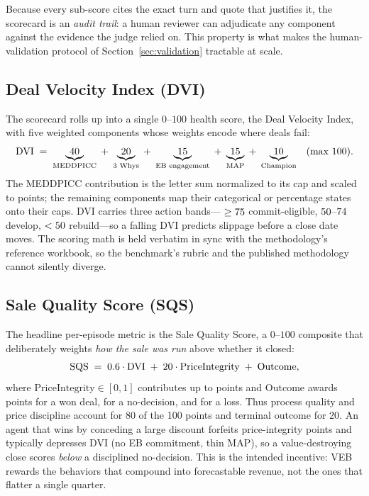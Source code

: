 Because every sub-score cites the exact turn and quote that justifies it, the
scorecard is an \emph{audit trail}: a human reviewer can adjudicate any component
against the evidence the judge relied on. This property is what makes the
human-validation protocol of Section~\ref{sec:validation} tractable at scale.

\subsection{Deal Velocity Index (DVI)}
The scorecard rolls up into a single $0$--$100$ health score, the Deal Velocity
Index, with five weighted components whose weights encode where deals fail:
\[
\mathrm{DVI} \;=\;
\underbrace{40}_{\text{MEDDPICC}} \;+\;
\underbrace{20}_{\text{3 Whys}} \;+\;
\underbrace{15}_{\text{EB engagement}} \;+\;
\underbrace{15}_{\text{MAP}} \;+\;
\underbrace{10}_{\text{Champion}}
\quad (\text{max } 100).
\]
The MEDDPICC contribution is the letter sum normalized to its cap and scaled to
\dviMEDDPICC{} points; the remaining components map their categorical or
percentage states onto their caps. DVI carries three action bands---
$\geq75$ commit-eligible, $50$--$74$ develop, $<50$
rebuild---so a falling DVI predicts slippage before a close date moves. The
scoring math is held verbatim in sync with the methodology's reference workbook,
so the benchmark's rubric and the published methodology cannot silently diverge.

\subsection{Sale Quality Score (SQS)}
The headline per-episode metric is the Sale Quality Score, a $0$--$100$ composite
that deliberately weights \emph{how the sale was run} above whether it closed:
\[
\mathrm{SQS} \;=\; 0.6 \cdot \mathrm{DVI}
\;+\; 20 \cdot \mathrm{PriceIntegrity}
\;+\; \mathrm{Outcome},
\]
where $\mathrm{PriceIntegrity}\in[0,1]$ contributes up to \sqsPriceCoef{} points
and $\mathrm{Outcome}$ awards \sqsWon{} points for a won deal, \sqsNoDecision{}
for a no-decision, and \sqsLost{} for a loss. Thus process quality and price
discipline account for \num{80} of the \num{100} points and terminal outcome for
\num{20}. An agent that wins by conceding a large discount forfeits price-integrity
points and typically depresses DVI (no EB commitment, thin MAP), so a
value-destroying close scores \emph{below} a disciplined no-decision. This is the
intended incentive: VEB rewards the behaviors that compound into forecastable
revenue, not the ones that flatter a single quarter.

